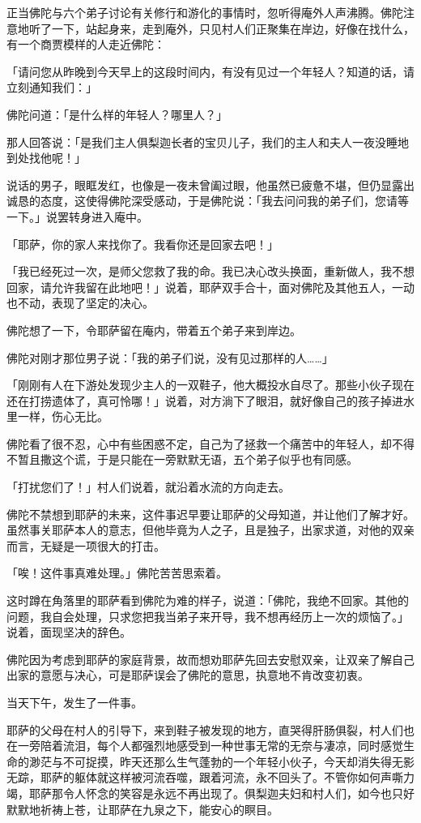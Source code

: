 \documentclass[twoside,openany]{book}
\begin{document}
正当佛陀与六个弟子讨论有关修行和游化的事情时，忽听得庵外人声沸腾。佛陀注意地听了一下，站起身来，走到庵外，只见村人们正聚集在岸边，好像在找什么，有一个商贾模样的人走近佛陀：

「请问您从昨晚到今天早上的这段时间内，有没有见过一个年轻人？知道的话，请立刻通知我们：」

佛陀问道：「是什么样的年轻人？哪里人？」

那人回答说：「是我们主人俱梨迦长者的宝贝儿子，我们的主人和夫人一夜没睡地到处找他呢！」

说话的男子，眼眶发红，也像是一夜未曾阖过眼，他虽然已疲惫不堪，但仍显露出诚恳的态度，这使得佛陀深受感动，于是佛陀说：「我去问问我的弟子们，您请等一下。」说罢转身进入庵中。

「耶萨，你的家人来找你了。我看你还是回家去吧！」

「我已经死过一次，是师父您救了我的命。我已决心改头换面，重新做人，我不想回家，请允许我留在此地吧！」说着，耶萨双手合十，面对佛陀及其他五人，一动也不动，表现了坚定的决心。

佛陀想了一下，令耶萨留在庵内，带着五个弟子来到岸边。

佛陀对刚才那位男子说：「我的弟子们说，没有见过那样的人……」

「刚刚有人在下游处发现少主人的一双鞋子，他大概投水自尽了。那些小伙子现在还在打捞遗体了，真可怜哪！」说着，对方淌下了眼泪，就好像自己的孩子掉进水里一样，伤心无比。

佛陀看了很不忍，心中有些困惑不定，自己为了拯救一个痛苦中的年轻人，却不得不暂且撒这个谎，于是只能在一旁默默无语，五个弟子似乎也有同感。

「打扰您们了！」村人们说着，就沿着水流的方向走去。

佛陀不禁想到耶萨的未来，这件事迟早要让耶萨的父母知道，并让他们了解才好。虽然事关耶萨本人的意志，但他毕竟为人之子，且是独子，出家求道，对他的双亲而言，无疑是一项很大的打击。

「唉！这件事真难处理。」佛陀苦苦思索着。

这时蹲在角落里的耶萨看到佛陀为难的样子，说道：「佛陀，我绝不回家。其他的问题，我自会处理，只求您把我当弟子来开导，我不想再经历上一次的烦恼了。」说着，面现坚决的辞色。

佛陀因为考虑到耶萨的家庭背景，故而想劝耶萨先回去安慰双亲，让双亲了解自己出家的意愿与决心，可是耶萨误会了佛陀的意思，执意地不肯改变初衷。

当天下午，发生了一件事。

耶萨的父母在村人的引导下，来到鞋子被发现的地方，直哭得肝肠俱裂，村人们也在一旁陪着流泪，每个人都强烈地感受到一种世事无常的无奈与凄凉，同时感觉生命的渺茫与不可捉摸，昨天还那么生气蓬勃的一个年轻小伙子，今天却消失得无影无踪，耶萨的躯体就这样被河流吞噬，跟着河流，永不回头了。不管你如何声嘶力竭，耶萨那令人怀念的笑容是永远不再出现了。俱梨迦夫妇和村人们，如今也只好默默地祈祷上苍，让耶萨在九泉之下，能安心的瞑目。
\end{document}
